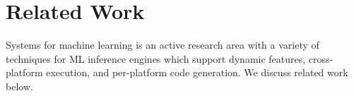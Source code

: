 \section{Related Work}
\label{sec:relwk}

Systems for machine learning is an active research area with a variety of techniques for ML inference engines which support dynamic features, cross-platform execution, and per-platform code generation. We discuss related work below.


